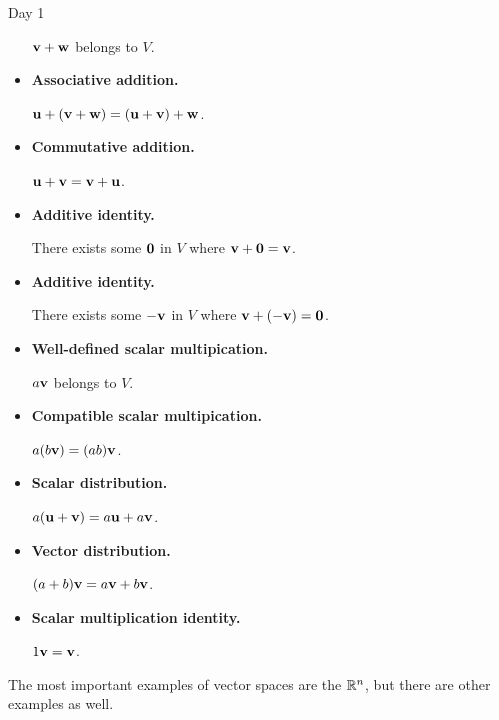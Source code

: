 \begin{applicationActivities}{Day 1}
\begin{definition}
\begin{multicols}{2}
\begin{itemize}
          \(\mathbf v+\mathbf w\) belongs to \(V\).
    \item \textbf{Associative addition.}

          \(\mathbf u+(\mathbf v+\mathbf w)=
          (\mathbf u+\mathbf v)+\mathbf w\).
    \item \textbf{Commutative addition.}

          \(\mathbf u+\mathbf v=
          \mathbf v+\mathbf u\).
    \item \textbf{Additive identity.}

          There exists some \(\mathbf 0\) in \(V\)
          where \(\mathbf v+\mathbf 0=\mathbf v\).
    \item \textbf{Additive identity.}

          There exists some \(-\mathbf v\) in \(V\)
          where \(\mathbf v+(-\mathbf v)=\mathbf 0\).
    \item \textbf{Well-defined scalar multipication.}

          \(a\mathbf v\) belongs to
          \(V\).
    \item \textbf{Compatible scalar multipication.}

          \(a(b\mathbf v)=(ab)\mathbf v\).
    \item \textbf{Scalar distribution.}

          \(a(\mathbf u+\mathbf v)=a\mathbf u+a\mathbf v\).
    \item \textbf{Vector distribution.}

          \((a+b)\mathbf v=a\mathbf v+b\mathbf v\).
    \item \textbf{Scalar multiplication identity.}

          \(1\mathbf v=\mathbf v\).
  \end{itemize}
  \end{multicols}
\end{definition}

\begin{definition}
  The most important examples of vector spaces are the  \(\mathbb{R}^n\), but there are other examples as well.
\end{definition}


\end{applicationActivities}
